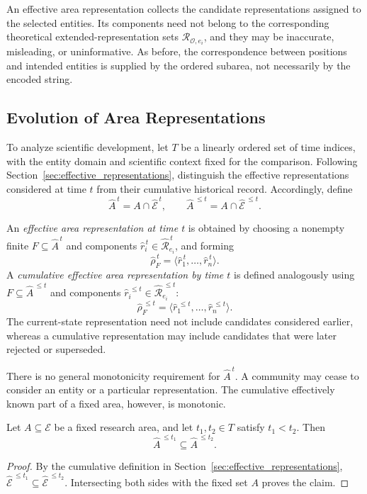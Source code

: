 An effective area representation collects the candidate representations assigned to the selected entities. Its components need not belong to the corresponding theoretical extended-representation sets $\mathcal R_{\mathcal O,e_i}$, and they may be inaccurate, misleading, or uninformative. As before, the correspondence between positions and intended entities is supplied by the ordered subarea, not necessarily by the encoded string.

\subsection*{Evolution of Area Representations}

To analyze scientific development, let $T$ be a linearly ordered set of time indices, with the entity domain and scientific context fixed for the comparison. Following Section~\ref{sec:effective_representations}, distinguish the effective representations considered at time $t$ from their cumulative historical record. Accordingly, define
\[
\hat A^{\,t}=A\cap\hat{\mathcal E}^{\,t},
\qquad
\hat A^{\,\leq t}=A\cap\hat{\mathcal E}^{\,\leq t}.
\]

An \emph{effective area representation at time $t$} is obtained by choosing a nonempty finite $F\subseteq\hat A^{\,t}$ and components $\hat r_i^{\,t}\in\hat{\mathcal R}_{e_i}^{\,t}$, and forming
\[
\hat\rho_F^{\,t}=\langle\hat r_1^{\,t},\ldots,\hat r_n^{\,t}\rangle.
\]
A \emph{cumulative effective area representation by time $t$} is defined analogously using $F\subseteq\hat A^{\,\leq t}$ and components $\hat r_i^{\,\leq t}\in\hat{\mathcal R}_{e_i}^{\,\leq t}$:
\[
\hat\rho_F^{\,\leq t}
=\langle\hat r_1^{\,\leq t},\ldots,\hat r_n^{\,\leq t}\rangle.
\]
The current-state representation need not include candidates considered earlier, whereas a cumulative representation may include candidates that were later rejected or superseded.

There is no general monotonicity requirement for $\hat A^{\,t}$. A community may cease to consider an entity or a particular representation. The cumulative effectively known part of a fixed area, however, is monotonic.

\begin{proposition}
Let $A\subseteq\mathcal E$ be a fixed research area, and let $t_1,t_2\in T$ satisfy $t_1<t_2$. Then
\[
\hat A^{\,\leq t_1}\subseteq\hat A^{\,\leq t_2}.
\]
\end{proposition}
\begin{proof}
By the cumulative definition in Section~\ref{sec:effective_representations},
$\hat{\mathcal E}^{\,\leq t_1}\subseteq\hat{\mathcal E}^{\,\leq t_2}$. Intersecting both sides with the fixed set $A$ proves the claim.
\end{proof}

